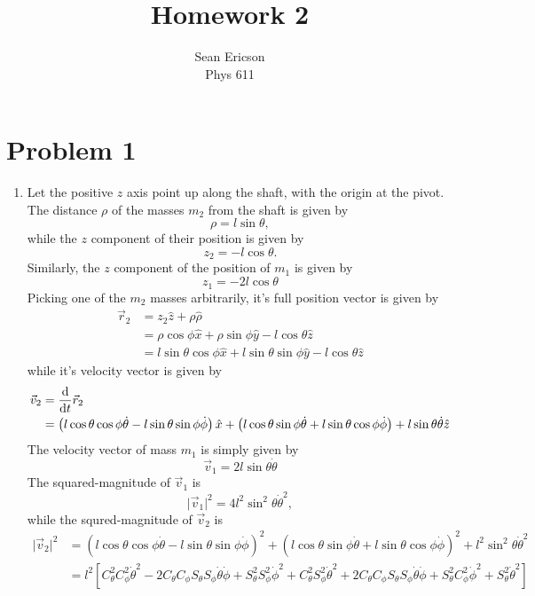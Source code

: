 \documentclass[12pt]{article}
\newcommand{\magsq}[1]{\big|#1\big|^2}
\begin{document}
\title{Homework 2}
\author{Sean Ericson \\ Phys 611}
\maketitle

\section*{Problem 1}
\begin{enumerate}[label=(\alph*)]
    \item Let the positive $z$ axis point up along the shaft, with the origin at the pivot. The distance $\rho$ of the masses $m_2$ from the shaft is given by
    \[ \rho = l\sin\theta, \]
    while the $z$ component of their position is given by
    \[ z_2 = -l\cos\theta. \]
    Similarly, the $z$ component of the position of $m_1$ is given by
    \[ z_1 = -2l\cos\theta \]
    Picking one of the $m_2$ masses arbitrarily, it's full position vector is given by
    \begin{align*}
        \vec{r}_2 &= z_2\hat{z} + \rho\hat{\rho} \\
        &= \rho\cos\phi\hat{x} + \rho\sin\phi\hat{y} - l\cos\theta\hat{z} \\
        &= l\sin\theta\cos\phi\hat{x} + l\sin\theta\sin\phi\hat{y} - l\cos\theta\hat{z}
    \end{align*}
    while it's velocity vector is given by 
    \begin{align*}
        \vec{v}_2 &= \dv{t}\vec{r}_2 \\
        &= \left(l\cos\theta\cos\phi\dot{\theta} - l\sin\theta\sin\phi\dot{\phi}\right)\hat{x} + \left(l\cos\theta\sin\phi\dot{\theta} + l\sin\theta\cos\phi\dot{\phi}\right) + l\sin\theta\dot{\theta}\hat{z}
    \end{align*}
    The velocity vector of mass $m_1$ is simply given by
    \[ \vec{v}_1 = 2l\sin\theta\dot{\theta} \]
    The squared-magnitude of $\vec{v}_1$ is
    \[  \magsq{\vec{v}_1} = 4l^2\sin^2\theta\dot{\theta}^2, \]
    while the squred-magnitude of $\vec{v}_2$ is
    \begin{align*}
        \magsq{\vec{v}_2} &= \left(l\cos\theta\cos\phi\dot{\theta} - l\sin\theta\sin\phi\dot{\phi}\right)^2 + \left(l\cos\theta\sin\phi\dot{\theta} + l\sin\theta\cos\phi\dot{\phi}\right)^2 + l^2\sin^2\theta\dot{\theta}^2 \\
        &= l^2\left[ C_\theta^2C_\phi^2\dot{\theta}^2 - 2C_\theta C_\phi S_\theta S_\phi\dot{\theta}\dot{\phi} + S_\theta^2S_\phi^2\dot{\phi}^2 + C_\theta^2S_\phi^2\dot{\theta}^2 + 2C_\theta C_\phi S_\theta S_\phi\dot{\theta}\dot{\phi} + S_\theta^2C_\phi^2\dot{\phi}^2 + S_\theta^2\dot{\theta}^2 \right] \\

\end{align*}
\end{enumerate}
\end{document}
